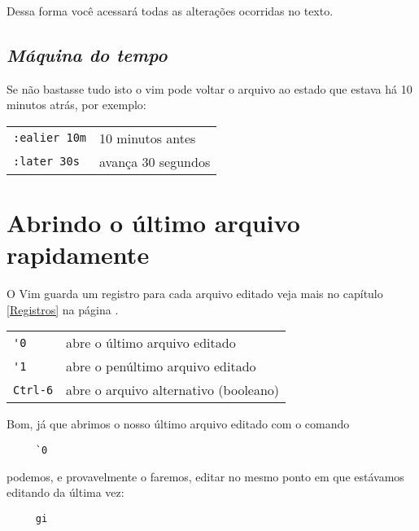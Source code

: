 Dessa forma você acessará todas as alterações ocorridas no texto.


\subsection{{\em Máquina do tempo}}
\label{Maquina do tempo}

Se não bastasse tudo isto o vim pode voltar o arquivo ao estado 
que estava há 10 minutos atrás, por exemplo:
\begin{table}[htb]\begin{center} \begin{tabular}{ll} \hline
    \verb|:ealier 10m| & 10 minutos antes\\
    \verb|:later 30s| & avança 30 segundos\\
\hline \end{tabular}\end{center}\end{table}

\section{Abrindo o último arquivo rapidamente}

O Vim guarda um registro para cada arquivo editado veja
mais no capítulo \ref{Registros} na página \pageref{Registros}.

\begin{table}[htb]\begin{center} \begin{tabular}{ll} \hline
     \verb|'0| &  abre o último arquivo editado\\
     \verb|'1| & abre o penúltimo arquivo editado\\
     \verb|Ctrl-6| & abre o arquivo alternativo (booleano)\\
\hline \end{tabular}\end{center}\end{table}

Bom, já que abrimos o nosso último arquivo editado com o comando

\begin{verbatim}
     `0
\end{verbatim}

podemos, e provavelmente o faremos, editar no mesmo ponto em que estávamos
editando da última vez:

\begin{verbatim}
     gi
\end{verbatim}

